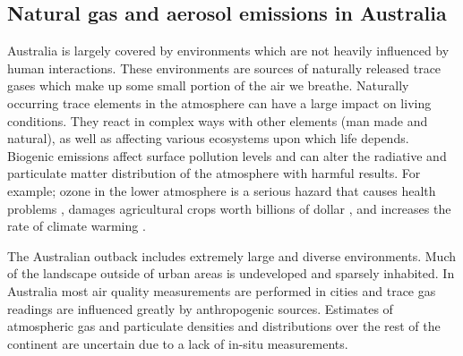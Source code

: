 \subsection{Natural gas and aerosol emissions in Australia}

Australia is largely covered by environments which are not heavily influenced by human interactions.
These environments are sources of naturally released trace gases which make up some small portion of the air we breathe.
Naturally occurring trace elements in the atmosphere can have a large impact on living conditions.
They react in complex ways with other elements (man made and natural), as well as affecting various ecosystems upon which life depends.
Biogenic emissions affect surface pollution levels and can alter the radiative and particulate matter distribution of the atmosphere with harmful results.
For example; ozone in the lower atmosphere is a serious hazard that causes health problems \cite{Hsieh_2013}, damages agricultural crops worth billions of dollar \cite{Avnery_2011}, and increases the rate of climate warming \cite{IPCC_2013_chap8}.

The Australian outback includes extremely large and diverse environments.
Much of the landscape outside of urban areas is undeveloped and sparsely inhabited.
In Australia most air quality measurements are performed in cities and trace gas readings are influenced greatly by anthropogenic sources.
Estimates of atmospheric gas and particulate densities and distributions over the rest of the continent are uncertain due to a lack of in-situ measurements.
  